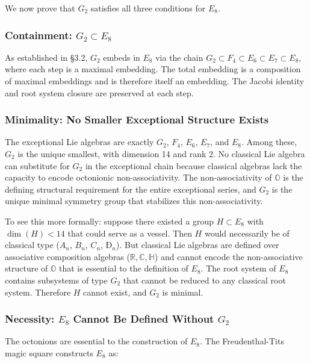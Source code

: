 \documentclass[12pt,a4paper]{article}
\newcommand{\pilcrow}{\S}
\begin{document}
We now prove that $G_2$ satisfies all three conditions for $E_8$.

\subsubsection{Containment: $G_2 \subset E_8$}

As established in \pilcrow{}3.2, $G_2$ embeds in $E_8$ via the chain $G_2 \subset F_4 \subset E_6 \subset E_7 \subset E_8$, where each step is a maximal embedding. The total embedding is a composition of maximal embeddings and is therefore itself an embedding. The Jacobi identity and root system closure are preserved at each step.

\subsubsection{Minimality: No Smaller Exceptional Structure Exists}

The exceptional Lie algebras are exactly $G_2$, $F_4$, $E_6$, $E_7$, and $E_8$. Among these, $G_2$ is the unique smallest, with dimension 14 and rank 2. No classical Lie algebra can substitute for $G_2$ in the exceptional chain because classical algebras lack the capacity to encode octonionic non-associativity. The non-associativity of $\mathbb{O}$ is the defining structural requirement for the entire exceptional series, and $G_2$ is the unique minimal symmetry group that stabilizes this non-associativity.

To see this more formally: suppose there existed a group $H \subset E_8$ with $\dim(H) < 14$ that could serve as a vessel. Then $H$ would necessarily be of classical type ($A_n$, $B_n$, $C_n$, $Ð_n$). But classical Lie algebras are defined over associative composition algebras ($\mathbb{R}, \mathbb{C}, \mathbb{H}$) and cannot encode the non-associative structure of $\mathbb{O}$ that is essential to the definition of $E_8$. The root system of $E_8$ contains subsystems of type $G_2$ that cannot be reduced to any classical root system. Therefore $H$ cannot exist, and $G_2$ is minimal.

\subsubsection{Necessity: $E_8$ Cannot Be Defined Without $G_2$}

The octonions are essential to the construction of $E_8$. The Freudenthal-Tits magic square constructs $E_8$ as:
\end{document}
